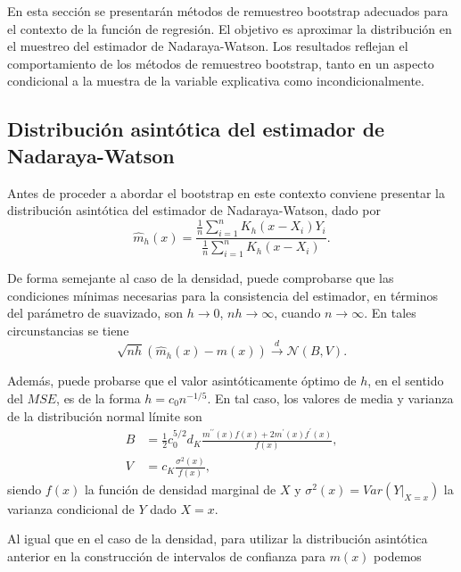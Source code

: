 \documentclass[]{book}
\theoremstyle{break}
\theoremstyle{definition}
\theoremstyle{definition}
\theoremstyle{definition}
\theoremstyle{remark}
\begin{document}
En esta sección se presentarán métodos de remuestreo bootstrap adecuados
para el contexto de la función de regresión. El objetivo es aproximar la
distribución en el muestreo del estimador de Nadaraya-Watson. Los
resultados reflejan el comportamiento de los métodos de remuestreo
bootstrap, tanto en un aspecto condicional a la muestra de la variable
explicativa como incondicionalmente.

\subsection{Distribución asintótica del estimador de
Nadaraya-Watson}\label{distribuciuxf3n-asintuxf3tica-del-estimador-de-nadaraya-watson}

Antes de proceder a abordar el bootstrap en este contexto conviene
presentar la distribución asintótica del estimador de Nadaraya-Watson,
dado por
\[\hat{m}_{h}\left( x \right) =\frac{\frac{1}{n}\sum_{i=1}^{n}K_{h}\left(
x-X_i \right) Y_i}{\frac{1}{n}\sum_{i=1}^{n}K_{h}\left( x-X_i \right)}.\]

De forma semejante al caso de la densidad, puede comprobarse que las
condiciones mínimas necesarias para la consistencia del estimador, en
términos del parámetro de suavizado, son \(h\rightarrow 0\),
\(nh\rightarrow \infty\), cuando \(n\rightarrow \infty\). En tales
circunstancias se tiene
\[\sqrt{nh}\left( \hat{m}_{h}\left( x \right) -m\left( x \right) \right) \overset
{d}{\rightarrow }\mathcal{N}\left( B,V \right) \text{.}\]

Además, puede probarse que el valor asintóticamente óptimo de \(h\), en
el sentido del \(MSE\), es de la forma \(h=c_{0}n^{-1/5}\). En tal caso,
los valores de media y varianza de la distribución normal límite son
\[\begin{aligned}
B &= \frac{1}{2}c_{0}^{5/2}d_{K}\frac{m^{\prime \prime }\left( x \right)
f\left( x \right) +2m^{\prime}\left( x \right) f^{\prime}\left( x \right)}{
f\left( x \right)}, \\
V &= c_{K}\frac{\sigma^2\left( x \right)}{f\left( x \right)},
\end{aligned}\] siendo \(f\left( x \right)\) la función de densidad
marginal de \(X\) y
\(\sigma^2\left( x \right) =Var\left( \left. Y\right\vert _{X=x} \right)\)
la varianza condicional de \(Y\) dado \(X=x\).

Al igual que en el caso de la densidad, para utilizar la distribución
asintótica anterior en la construcción de intervalos de confianza para
\(m\left( x \right)\) podemos
\end{document}
